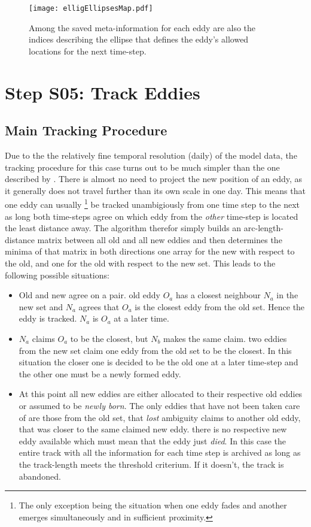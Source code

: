 \begin{figure}
		\texttt{[image: elligEllipsesMap.pdf]}
		\caption{Among the saved meta-information for each eddy are also the indices describing the ellipse that defines the eddy's allowed locations for the next time-step.}
		\label{fig:elligEllipse}
\end{figure}
\newpage
\section{Step S05: Track Eddies} \label{S:05}
\subsection{Main Tracking Procedure}
Due to the the relatively fine temporal resolution (daily) of the model data,
the tracking procedure for this case turns out to be much simpler than the one described by \citet{Chelton2007}. There is almost no need to project the new position of an
eddy, as it generally does not travel further than its own scale in one day.
This means that one eddy can usually \footnote{The only exception being the situation when one eddy fades and  another emerges simultaneously and in sufficient proximity.} be tracked unambigiously from one time step to the
next as long both time-steps agree on which eddy from the \textit{other}
time-step is located the least distance away.
The algorithm therefor simply builds an arc-length-distance matrix
between all old and all new eddies and then determines the minima of that
matrix in both directions \ie one array for the new with respect to the old,
and one for the old with respect to the new set. This leads to the following
possible situations:
\begin{itemize}
\item
	Old and new agree on a pair. \Ie old eddy $O_a$ has a closest neighbour $N_a$ in
the new set and $N_a$ agrees that $O_a$ is the closest eddy from the old
set. Hence the eddy is tracked.  $N_a$ is $O_a$ at a later time.
\item
$N_a$ claims $O_a$ to be the closest, but $N_b$ makes the same claim. \Ie two
eddies from the new set claim one eddy from the old set to be the closest.
In this situation the closer one is decided to be the old one at a later
time-step and the other one must be a newly formed eddy.
\item
At this point all new eddies are either allocated to their respective old
eddies or assumed to be \textit{newly born}. The only eddies that have not been
taken care of are those from the old set, that \textit{lost} ambiguity claims to
another old eddy, that was closer to the same claimed new eddy. \Ie there is no
respective new eddy available which must mean that the eddy just \textit{died}.
In this case the entire track with all the information for each time step is
archived as long as the track-length meets the threshold criterium. If it doesn't,
the track is abandoned.
\end{itemize}
